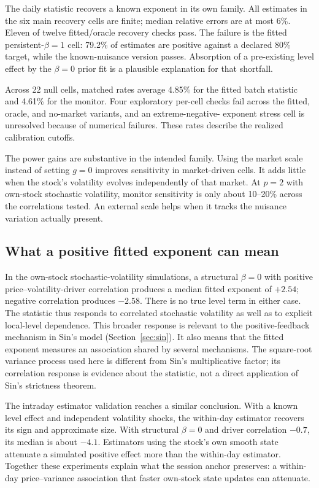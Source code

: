 The daily statistic recovers a known exponent in its own family. All
estimates in the six main recovery cells are finite; median relative errors
are at most 6\%. Eleven of twelve fitted/oracle recovery checks pass. The
failure is the fitted persistent-$\beta=1$ cell: 79.2\% of estimates are
positive against a declared 80\% target, while the known-nuisance version
passes. Absorption of a pre-existing level effect by the $\beta=0$ prior fit
is a plausible explanation for that shortfall.

Across 22 null cells, matched rates average 4.85\% for the fitted batch
statistic and 4.61\% for the monitor. Four exploratory per-cell checks fail
across the fitted, oracle, and no-market variants, and an extreme-negative-
exponent stress cell is unresolved because of numerical failures. These
rates describe the realized calibration cutoffs.

The power gains are substantive in the intended family. Using the market
scale instead of setting $g=0$ improves sensitivity in market-driven cells.
It adds little when the stock's volatility evolves independently of that
market. At $p=2$ with own-stock stochastic volatility, monitor sensitivity
is only about 10--20\% across the correlations tested. An external scale
helps when it tracks the nuisance variation actually present.

\subsection{What a positive fitted exponent can mean}
In the own-stock stochastic-volatility simulations, a structural
$\beta=0$ with positive price--volatility-driver correlation produces a
median fitted exponent of $+2.54$; negative correlation produces $-2.58$.
There is no true level term in either case. The statistic thus responds to
correlated stochastic volatility as well as to explicit local-level
dependence. This broader response is relevant to the positive-feedback mechanism in
Sin's model (Section~\ref{sec:sin}). It also means that the fitted exponent
measures an association shared by several mechanisms. The square-root
variance process used here is different from Sin's multiplicative factor;
its correlation response is evidence about the statistic, not a direct
application of Sin's strictness theorem.

The intraday estimator validation reaches a similar conclusion. With a
known level effect and independent volatility shocks, the within-day
estimator recovers its sign and approximate size. With structural
$\beta=0$ and driver correlation $-0.7$, its median is about $-4.1$.
Estimators using the stock's own smooth state attenuate a simulated positive
effect more than the within-day estimator. Together these experiments explain what the session anchor preserves: a
within-day price--variance association that faster own-stock state updates
can attenuate.

